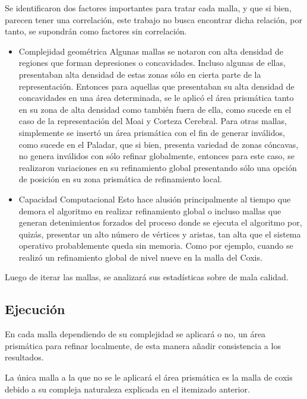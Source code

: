 Se identificaron dos factores importantes para tratar cada malla, y que si bien, parecen tener una correlación, este trabajo no busca encontrar dicha relación, por tanto, se supondrán como factores sin correlación.
\begin{itemize}
	\item Complejidad geométrica
		Algunas mallas se notaron con alta densidad de regiones que forman depresiones o concavidades. Incluso algunas de ellas, presentaban alta densidad de estas zonas sólo en cierta parte de la representación.
		Entonces para aquellas que presentaban su alta densidad de concavidades en una área determinada, se le aplicó el área prismática tanto en su zona de alta densidad como también fuera de ella, como sucede en el caso de la representación del Moai y Corteza Cerebral.
		Para otras mallas, simplemente se insertó un área prismática con el fin de generar \elements{} inválidos, como sucede en el Paladar, que si bien, presenta variedad de zonas cóncavas, no genera \elements{} inválidos con sólo refinar globalmente, entonces para este caso, se realizaron variaciones en su refinamiento global presentando sólo una opción de posición en su zona prismática de refinamiento local.
		
	\item Capacidad Computacional
		Esto hace alusión principalmente al tiempo que demora el algoritmo en realizar refinamiento global o incluso mallas que generan detenimientos forzados del proceso donde se ejecuta el algoritmo por, quizás, presentar un alto número de vértices y aristas, tan alta que el sistema operativo probablemente queda sin memoria. Como por ejemplo, cuando se realizó un refinamiento global de nivel nueve en la malla del Coxis.
\end{itemize}

Luego de iterar las mallas, se analizará sus estadísticas sobre \elements{} de mala calidad.

\subsection{Ejecución}

En cada malla dependiendo de su complejidad se aplicará o no, un área prismática para refinar localmente, de esta manera añadir consistencia a los resultados.

La única malla a la que no se le aplicará el área prismática es la malla de coxis debido a su compleja naturaleza explicada en el itemizado anterior.

